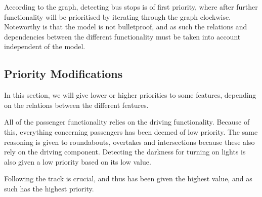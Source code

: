 According to the graph, detecting bus stops is of first priority, where after further functionality will be prioritised by iterating through the graph clockwise. Noteworthy is that the model is not bulletproof, and as such the relations and dependencies between the different functionality must be taken into account independent of the model.

\subsection{Priority Modifications} %

In this section, we will give lower or higher priorities to some features, depending on the relations between the different features.

All of the passenger functionality relies on the driving functionality. Because of this, everything concerning passengers has been deemed of low priority. The same reasoning is given to roundabouts, overtakes and intersections because these also rely on the driving component. Detecting the darkness for turning on lights is also given a low priority based on its low value.

Following the track is crucial, and thus has been given the highest value, and as such has the highest priority.
